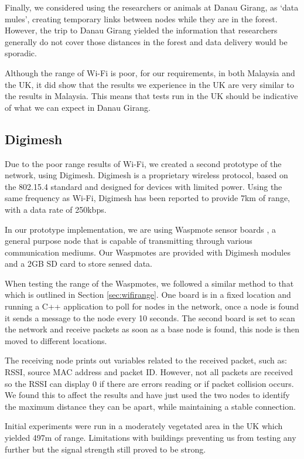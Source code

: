 Finally, we considered using the researchers or animals at Danau Girang, as `data mules', creating temporary links between nodes while they are in the forest. However, the trip to Danau Girang yielded the information that researchers generally do not cover those distances in the forest and data delivery would be sporadic.
			
Although the range of Wi-Fi is poor, for our requirements, in both Malaysia and the UK, it did show that the results we experience in the UK are very similar to the results in Malaysia. This means that tests run in the UK should be indicative of what we can expect in Danau Girang.

\subsection{Digimesh}\label{tech:digimesh}
		Due to the poor range results of Wi-Fi, we created a second prototype of the network, using Digimesh. Digimesh is a proprietary wireless protocol, based on the 802.15.4 standard and designed for devices with limited power. Using the same frequency as Wi-Fi, Digimesh has been reported to provide 7km of range, with a data rate of 250kbps.
		
In our prototype implementation, we are using Waspmote sensor boards \cite{Waspmote}, a general purpose node that is capable of transmitting through various communication mediums. Our Waspmotes are provided with Digimesh modules and a 2GB SD card to store sensed data.
		
When testing the range of the Waspmotes, we followed a similar method to that which is outlined in Section \ref{sec:wifirange}. One board is in a fixed location and running a C++ application to poll for nodes in the network, once a node is found it sends a message to the node every 10 seconds. The second board is set to scan the network and receive packets as soon as a base node is found, this node is then moved to different locations.
			
The receiving node prints out variables related to the received packet, such as: RSSI, source MAC address and packet ID. However, not all packets are received so the RSSI can display 0 if there are errors reading or if packet collision occurs. We found this to affect the results and have just used the two nodes to identify the maximum distance they can be apart, while maintaining a stable connection.
					
Initial experiments were run in a moderately vegetated area in the UK which yielded 497m of range. Limitations with buildings preventing us from testing any further but the signal strength still proved to be strong.
			
